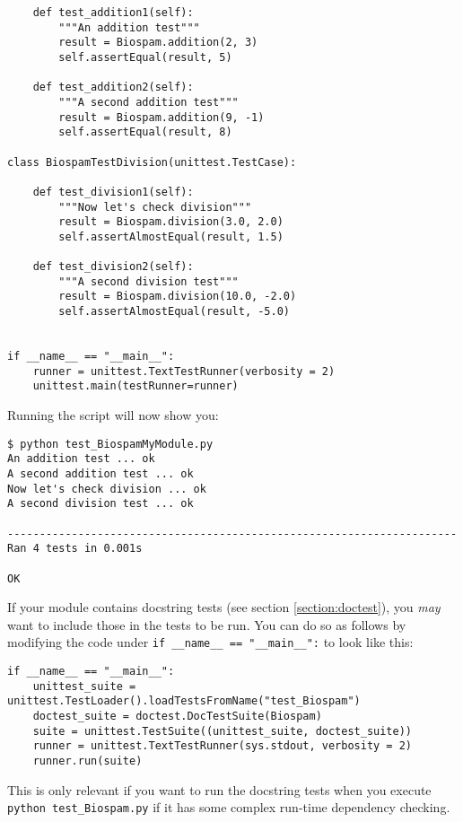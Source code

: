 \begin{itemize}
\begin{verbatim}
    def test_addition1(self):
        """An addition test"""
        result = Biospam.addition(2, 3)
        self.assertEqual(result, 5)

    def test_addition2(self):
        """A second addition test"""
        result = Biospam.addition(9, -1)
        self.assertEqual(result, 8)

class BiospamTestDivision(unittest.TestCase):

    def test_division1(self):
        """Now let's check division"""
        result = Biospam.division(3.0, 2.0)
        self.assertAlmostEqual(result, 1.5)

    def test_division2(self):
        """A second division test"""
        result = Biospam.division(10.0, -2.0)
        self.assertAlmostEqual(result, -5.0)


if __name__ == "__main__":
    runner = unittest.TextTestRunner(verbosity = 2)
    unittest.main(testRunner=runner)
\end{verbatim}

        Running the script will now show you:

\begin{verbatim}
$ python test_BiospamMyModule.py
An addition test ... ok
A second addition test ... ok
Now let's check division ... ok
A second division test ... ok

----------------------------------------------------------------------
Ran 4 tests in 0.001s

OK
\end{verbatim}
\end{itemize}

If your module contains docstring tests (see section \ref{section:doctest}),
you \emph{may} want to include those in the tests to be run. You can do so as
follows by modifying the code under \verb|if __name__ == "__main__":|
to look like this:

\begin{verbatim}
if __name__ == "__main__":
    unittest_suite = unittest.TestLoader().loadTestsFromName("test_Biospam")
    doctest_suite = doctest.DocTestSuite(Biospam)
    suite = unittest.TestSuite((unittest_suite, doctest_suite))
    runner = unittest.TextTestRunner(sys.stdout, verbosity = 2)
    runner.run(suite)
\end{verbatim}

This is only relevant if you want to run the docstring tests when you
execute \verb|python test_Biospam.py| if it has some complex run-time
dependency checking.

